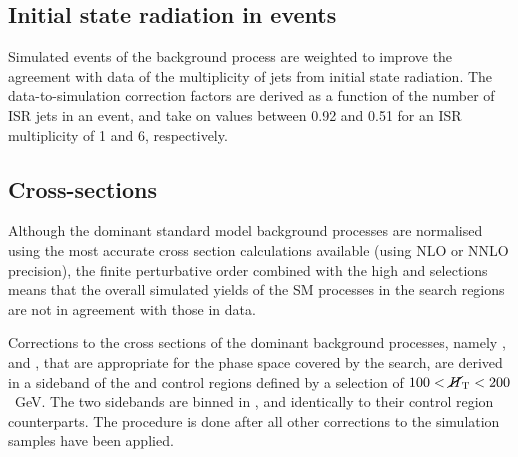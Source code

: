 \subsection{Initial state radiation in \ttbar events}
\label{sec:analysis-mccorrections-nisr}

Simulated events of the \ttbar background process are weighted to improve the 
agreement with data of the multiplicity of jets from initial state radiation. 
The data-to-simulation correction factors are derived as a function of the 
number of ISR jets in an event, and take on values between 0.92 and 0.51 for an 
ISR multiplicity of 1 and 6, respectively.

\subsection{Cross-sections}
\label{sec:analysis-mccorrections-sidebandcorrs}
Although the dominant standard model background processes are normalised using 
the most accurate cross section calculations available (using NLO or NNLO 
precision), the finite perturbative order combined with the high \scalht and 
\met selections means that the overall simulated yields of the SM processes in 
the search regions are not in agreement with those in data.

Corrections to the cross sections of the dominant background processes, namely 
\zj, \wj and \ttbar, that are appropriate for the phase space covered by the 
search, are derived in a sideband of the \mj and \mmj control 
regions defined by a selection of $100<\mbox{$\cancel{H}_\text{T}$}<200$~GeV.
The two \mht sidebands are binned in \njet, \nb and \scalht identically to 
their control region counterparts.
The procedure is done after all other corrections to the simulation samples 
have been applied.

